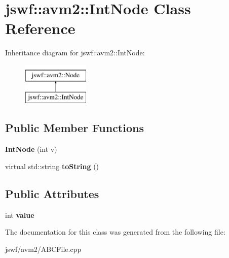 \hypertarget{classjswf_1_1avm2_1_1_int_node}{\section{jswf\+:\+:avm2\+:\+:Int\+Node Class Reference}
\label{classjswf_1_1avm2_1_1_int_node}
}
Inheritance diagram for jswf\+:\+:avm2\+:\+:Int\+Node\+:\begin{figure}[H]
\begin{center}
\leavevmode
\includegraphics[height=2.000000cm]{classjswf_1_1avm2_1_1_int_node}
\end{center}
\end{figure}
\subsection*{Public Member Functions}
\begin{DoxyCompactItemize}
\item 
\hypertarget{classjswf_1_1avm2_1_1_int_node_ac860fb31c3644703d5f2a320de7c689c}{{\bfseries Int\+Node} (int v)}\label{classjswf_1_1avm2_1_1_int_node_ac860fb31c3644703d5f2a320de7c689c}

\item 
\hypertarget{classjswf_1_1avm2_1_1_int_node_ac133698b3814a295b96d1acc618c1790}{virtual std\+::string {\bfseries to\+String} ()}\label{classjswf_1_1avm2_1_1_int_node_ac133698b3814a295b96d1acc618c1790}

\end{DoxyCompactItemize}
\subsection*{Public Attributes}
\begin{DoxyCompactItemize}
\item 
\hypertarget{classjswf_1_1avm2_1_1_int_node_a2a3722587e9ab0745cde102b4559d8d1}{int {\bfseries value}}\label{classjswf_1_1avm2_1_1_int_node_a2a3722587e9ab0745cde102b4559d8d1}

\end{DoxyCompactItemize}


The documentation for this class was generated from the following file\+:\begin{DoxyCompactItemize}
\item 
jswf/avm2/A\+B\+C\+File.\+cpp\end{DoxyCompactItemize}
